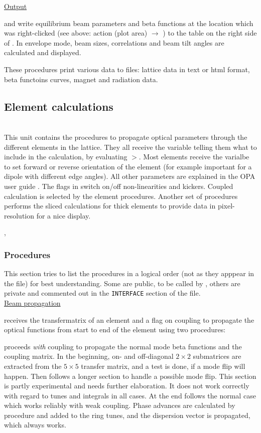\documentclass[12pt]{article}
\newcommand\code[1]{{\tt #1}}
\newcommand{\ofldx}[1]{\colorbox{black!15}{{\color{black}(#1)}}}
\newcommand\guico[1]{{\color{blue}\code{#1}}}
\newcommand{\unico}[1]{{\color{burntorange}\code{#1}}}
\newcommand{\evcodx}[2]{\ofldx{#1} $\rightarrow$ \guico{#2}}
\newcommand{\prcod}[2]{\opauni{#1}$>$\unico{#2}}
\newcommand{\opagui}[1]{\colorbox{blue!20}{{\color{black}\code{#1}}}}
\newcommand{\ogui}[1]{\hyperref[#1]{\opagui{#1}}}
\newcommand{\opauni}[1]{\colorbox{orange!30}{{\color{black}\code{#1}}}}
\newcommand{\ounih}[2]{\subsection{\label{#2}#1}{\Huge\opauni{#2}}\\}
\newcommand{\ouni}[1]{\hyperref[#1]{\opauni{#1}}}
\newcommand{\uses}[1]{\flushleft {\bf Uses:} #1}
\newcommand{\desc}[1]{#1}
\newcommand{\todo}[1]{{\color{red} #1}}
\begin{document}
{\underline{Output}

\unico{FillBeamTab} and \unico{FillBetaTab} write equilibrium beam parameters and beta functions at the location which was right-clicked (see above: \ogui{opalinop} action \evcodx{plot area}{pwMouseDown}) to the table on the right side of \ogui{opalinop}. In envelope mode, beam sizes, correlations and beam tilt angles are calculated and displayed. 

\unico{Print\dots} These procedures print various data to files: lattice data in text or html format, beta functoins curves, magnet and radiation data.
}

\ounih{Element calculations}{elemlib} 

\desc{This unit contains the procedures to propagate optical parameters through the different elements in the lattice. They all receive the variable \unico{mode} telling them what to include in the calculation, by evaluating \prcod{elemlib}{switch}. Most elements receive the varialbe \unico{idir} to set forward or reverse orientation of the element (for example important for a dipole with different edge angles). All other parameters are explained in the OPA user guide \cite{userguide}. 
The flags \unico{UseSext,UsePulsed} in \ouni{globlib} switch on/off non-linearities and kickers. Coupled calculation is selected by the element procedures. Another set of procedures performs the sliced calculations for thick elements to provide data in pixel-resolution for a nice display. 
}

\uses{\ouni{globlib}, \ouni{mathlib}}

\subsubsection*{Procedures}

This section tries to list the procedures in a logical order (not as they apppear in the file) for best understanding. Some are public, to be called by \ouni{linoplib}, others are private and commented out in the \code{INTERFACE} section of the file.\\

\underline{Beam propagation}

\unico{Propagate} receives the transfermatrix of an element and a flag on coupling to propagate the optical functions from start to end of the element using two procedures:

\unico{MCC\_prop} proceeds {\em with} coupling to propagate the normal mode beta functions and the coupling matrix. In the beginning, on- and off-diagonal $2\times 2$ submatrices are extracted from the $5\times 5$ transfer matrix, and a test is done, if a mode flip will happen. Then follows a longer section to handle a possible mode flip. \todo{This section is partly experimental and needs further elaboration. It does not work correctly with regard to tunes and integrals in all cases.} At the end follows the normal case which works reliably with weak coupling. Phase advances are calculated by procedure \unico{PhaseAdvance} and added to the ring tunes, and the dispersion vector is propagated, which always works.
\end{document}
